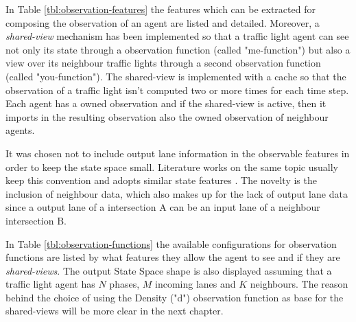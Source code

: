 
In Table \ref{tbl:observation-features} the features which can be extracted for composing the observation of an agent are listed and detailed.
Moreover, a \textit{shared-view} mechanism has been implemented so that a traffic light agent can see not only its state through a observation function (called "me-function") but also a view over its neighbour traffic lights through a second observation function (called "you-function").
The shared-view is implemented with a cache so that the observation of a traffic light isn't computed two or more times for each time step.
Each agent has a owned observation and if the shared-view is active, then it imports in the resulting observation also the owned observation of neighbour agents.

It was chosen not to include output lane information in the observable features in order to keep the state space small. Literature works on the same topic usually keep this convention and adopts similar state features \cite{wei2019presslight} \cite{han2023leveraging}. The novelty is the inclusion of neighbour data, which also makes up for the lack of output lane data since a output lane of a intersection A can be an input lane of a neighbour intersection B.

In Table \ref{tbl:observation-functions} the available configurations for observation functions are listed by what features they allow the agent to see and if they are \textit{shared-views}. The output State Space shape is also displayed assuming that a traffic light agent has $N$ phases, $M$ incoming lanes and $K$ neighbours.
The reason behind the choice of using the Density ("d") observation function as base for the shared-views will be more clear in the next chapter.


